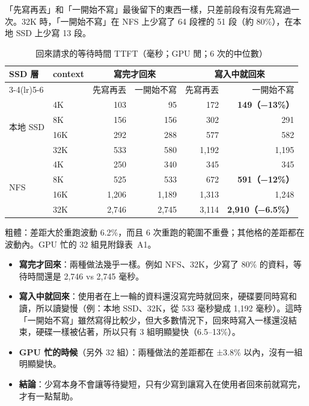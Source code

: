 \documentclass[11pt,a4paper]{article}
\newcommand{\note}[1]{{\footnotesize\color{black!70}#1}}
\begin{document}
「先寫再丟」和「一開始不寫」最後留下的東西一樣，只差前段有沒有先寫過一次。32K 時，「一開始不寫」在 NFS 上少寫了 64 段裡的 51 段（約 80\%），在本地 SSD 上少寫 13 段。

\begin{table}[h]
\centering
\caption{回來請求的等待時間 TTFT（毫秒；GPU 閒；6 次的中位數）}\label{tab:q1}
\begin{tabular}{llrrrr}
\toprule
\multirow{2}{*}{SSD 層} & \multirow{2}{*}{context} & \multicolumn{2}{c}{寫完才回來} & \multicolumn{2}{c}{寫入中就回來} \\
\cmidrule(lr){3-4}\cmidrule(lr){5-6}
 & & 先寫再丟 & 一開始不寫 & 先寫再丟 & 一開始不寫 \\
\midrule
\multirow{4}{*}{本地 SSD} & 4K & 103 & 95 & 172 & \textbf{149（−13\%）} \\
 & 8K & 156 & 156 & 302 & 291 \\
 & 16K & 292 & 288 & 577 & 582 \\
 & 32K & 533 & 580 & 1,192 & 1,195 \\
\midrule
\multirow{4}{*}{NFS} & 4K & 250 & 340 & 345 & 345 \\
 & 8K & 525 & 533 & 672 & \textbf{591（−12\%）} \\
 & 16K & 1,206 & 1,189 & 1,313 & 1,248 \\
 & 32K & 2,746 & 2,745 & 3,114 & \textbf{2,910（−6.5\%）} \\
\bottomrule
\end{tabular}

\vspace{2pt}
\note{粗體：差距大於重跑波動 6.2\%，而且 6 次重跑的範圍不重疊；其他格的差距都在波動內。GPU 忙的 32 組見附錄表~A1。}
\end{table}

\begin{itemize}
\item \textbf{寫完才回來}：兩種做法幾乎一樣。例如 NFS、32K，少寫了 80\% 的資料，等待時間還是 2,746 vs 2,745 毫秒。
\item \textbf{寫入中就回來}：使用者在上一輪的資料還沒寫完時就回來，硬碟要同時寫和讀，所以讀變慢（例：本地 SSD、32K，從 533 毫秒變成 1,192 毫秒）。這時「一開始不寫」雖然寫得比較少，但大多數情況下，回來時寫入一樣還沒結束，硬碟一樣被佔著，所以只有 3 組明顯變快（6.5--13\%）。
\item \textbf{GPU 忙的時候}（另外 32 組）：兩種做法的差距都在 ±3.8\% 以內，沒有一組明顯變快。
\item \textbf{結論}：少寫本身不會讓等待變短，只有少寫到讓寫入在使用者回來前就寫完，才有一點幫助。
\end{itemize}
\end{document}
